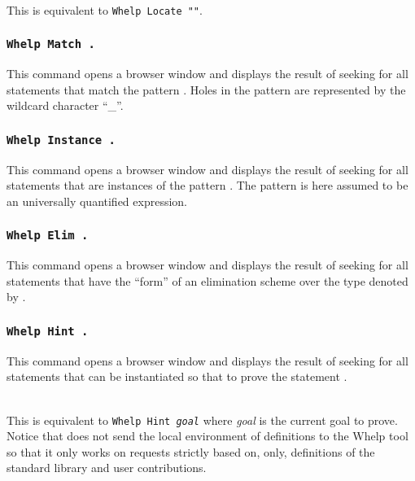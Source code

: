 \\
This is equivalent to {\tt Whelp Locate "{\ident}"}.

\subsubsection{\tt Whelp Match {\pattern}.
}

This command opens a browser window and displays the result of seeking
for all statements that match the pattern {\pattern}. Holes in the
pattern are represented by the wildcard character ``\_''.

\subsubsection[\tt Whelp Instance {\pattern}.]{\tt Whelp Instance {\pattern}.}

This command opens a browser window and displays the result of seeking
for all statements that are instances of the pattern {\pattern}. The
pattern is here assumed to be an universally quantified expression.

\subsubsection[\tt Whelp Elim {\qualid}.]{\tt Whelp Elim {\qualid}.}

This command opens a browser window and displays the result of seeking
for all statements that have the ``form'' of an elimination scheme
over the type denoted by {\qualid}.

\subsubsection[\tt Whelp Hint {\term}.]{\tt Whelp Hint {\term}.}

This command opens a browser window and displays the result of seeking
for all statements that can be instantiated so that to prove the
statement {\term}.

\\ This is equivalent to {\tt Whelp Hint
{\sl goal}} where {\sl goal} is the current goal to prove. Notice that
{\Coq} does not send the local environment of definitions to the {\sc
Whelp} tool so that it only works on requests strictly based on, only,
definitions of the standard library and user contributions.

